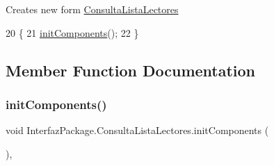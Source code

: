 Creates new form \mbox{\hyperlink{class_interfaz_package_1_1_consulta_lista_lectores}{Consulta\+Lista\+Lectores}} 
\begin{DoxyCode}
20                                    \{
21         \mbox{\hyperlink{class_interfaz_package_1_1_consulta_lista_lectores_a6c8f44a19bc6e5223ce9d5d1e952e0a6}{initComponents}}();
22     \}
\end{DoxyCode}


\subsection{Member Function Documentation}
\mbox{\label{class_interfaz_package_1_1_consulta_lista_lectores_a6c8f44a19bc6e5223ce9d5d1e952e0a6}} 
\subsubsection{\texorpdfstring{init\+Components()}{initComponents()}}
{\footnotesize\ttfamily void Interfaz\+Package.\+Consulta\+Lista\+Lectores.\+init\+Components (\begin{DoxyParamCaption}{ }\end{DoxyParamCaption})\hspace{0.3cm}{\ttfamily [inline]}, {\ttfamily [private]}}

